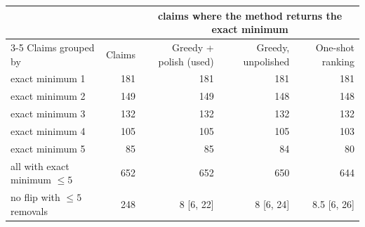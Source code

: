 \begin{tabular}{lrrrr}
\toprule
 & & \multicolumn{3}{c}{claims where the method returns the exact minimum} \\
\cmidrule(lr){3-5}
Claims grouped by & Claims & Greedy + polish (used) & Greedy, unpolished & One-shot ranking \\
\midrule
exact minimum 1 & 181 & 181 & 181 & 181 \\
exact minimum 2 & 149 & 149 & 148 & 148 \\
exact minimum 3 & 132 & 132 & 132 & 132 \\
exact minimum 4 & 105 & 105 & 105 & 103 \\
exact minimum 5 & 85 & 85 & 84 & 80 \\
\midrule
all with exact minimum $\le 5$ & 652 & 652 & 650 & 644 \\
no flip with $\le 5$ removals & 248 & 8 [6, 22] & 8 [6, 24] & 8.5 [6, 26] \\
\bottomrule
\end{tabular}
